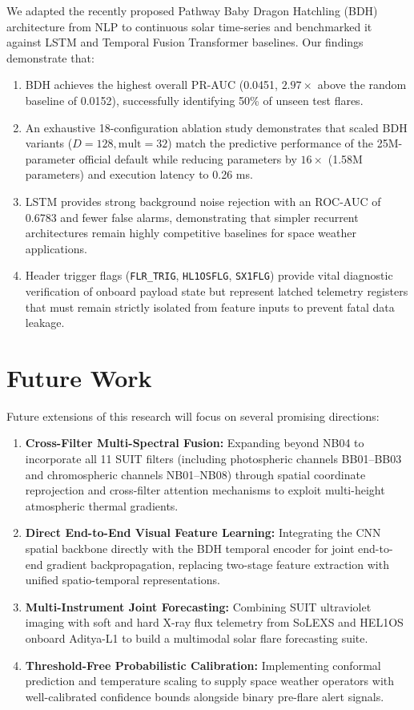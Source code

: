 \documentclass[oneside]{ieeeaccess}
\begin{document}
We adapted the recently proposed Pathway Baby Dragon Hatchling (BDH) architecture from NLP to continuous solar time-series and benchmarked it against LSTM and Temporal Fusion Transformer baselines. Our findings demonstrate that:
\begin{enumerate}
    \item BDH achieves the highest overall PR-AUC (0.0451, $2.97\times$ above the random baseline of 0.0152), successfully identifying 50\% of unseen test flares.
    \item An exhaustive 18-configuration ablation study demonstrates that scaled BDH variants ($D=128, \mathrm{mult}=32$) match the predictive performance of the 25M-parameter official default while reducing parameters by $16\times$ (1.58M parameters) and execution latency to 0.26 ms.
    \item LSTM provides strong background noise rejection with an ROC-AUC of 0.6783 and fewer false alarms, demonstrating that simpler recurrent architectures remain highly competitive baselines for space weather applications.
    \item Header trigger flags (\texttt{FLR\_TRIG}, \texttt{HL1OSFLG}, \texttt{SX1FLG}) provide vital diagnostic verification of onboard payload state but represent latched telemetry registers that must remain strictly isolated from feature inputs to prevent fatal data leakage.
\end{enumerate}

\section{Future Work}

Future extensions of this research will focus on several promising directions:
\begin{enumerate}
    \item \textbf{Cross-Filter Multi-Spectral Fusion:} Expanding beyond NB04 to incorporate all 11 SUIT filters (including photospheric channels BB01--BB03 and chromospheric channels NB01--NB08) through spatial coordinate reprojection and cross-filter attention mechanisms to exploit multi-height atmospheric thermal gradients.
    \item \textbf{Direct End-to-End Visual Feature Learning:} Integrating the CNN spatial backbone directly with the BDH temporal encoder for joint end-to-end gradient backpropagation, replacing two-stage feature extraction with unified spatio-temporal representations.
    \item \textbf{Multi-Instrument Joint Forecasting:} Combining SUIT ultraviolet imaging with soft and hard X-ray flux telemetry from SoLEXS and HEL1OS onboard Aditya-L1 to build a multimodal solar flare forecasting suite.
    \item \textbf{Threshold-Free Probabilistic Calibration:} Implementing conformal prediction and temperature scaling to supply space weather operators with well-calibrated confidence bounds alongside binary pre-flare alert signals.
\end{enumerate}
\end{document}
